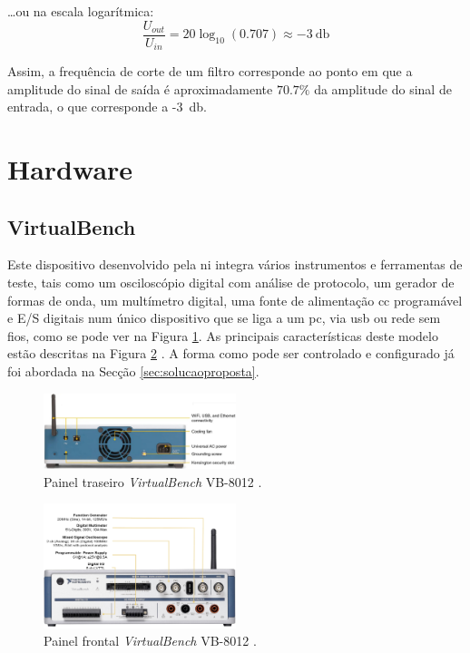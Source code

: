 	\ldots ou na escala logarítmica:  
\begin{equation} \label{eq:relacaoGanhodB}
	\frac{U_{out}}{U_{in}} = 20 \log_{10} (0.707) \approx -\SI{3}{\decibel}	
\end{equation}
	
Assim, a frequência de corte de um filtro corresponde ao ponto em que a amplitude do sinal de saída é aproximadamente $70.7\%$ da amplitude do sinal de entrada, o que corresponde a -\SI{3}{\decibel}. 

\section{Hardware}
\label{sec:hardware}
\subsection{VirtualBench}
Este dispositivo desenvolvido pela \acrshort{ni} integra vários instrumentos e ferramentas de teste, tais como um osciloscópio digital com análise de protocolo, um gerador de formas de onda, um multímetro digital, uma fonte de alimentação \acrfull{cc} programável e E/S digitais num único dispositivo que se liga a um \acrshort{pc}, via \acrshort{usb} ou rede sem fios, como se pode ver na Figura \ref{fig:paineltraseiro}. As principais características deste modelo estão descritas na Figura \ref{fig:paineldianteiro} \cite{datasheetVirtualBench}. A forma como pode ser controlado e configurado já foi abordada na Secção \ref{sec:solucaoproposta}.

\begin{figure}[hbtp]
    \centering
    \centering
    \includegraphics[width=0.5\textwidth]{figures/virtualbench_back-panel.jpg}
    \caption{Painel traseiro \textit{VirtualBench} VB-8012  \cite{datasheetVirtualBench}.}
    \label{fig:paineltraseiro}
\end{figure}

\begin{figure}[hbtp]
    \centering
    \includegraphics[width=0.5\textwidth]{figures/virtualbench_front-panel.jpg}
    \caption{Painel frontal \textit{VirtualBench} VB-8012  \cite{datasheetVirtualBench}.}
    \label{fig:paineldianteiro}
\end{figure}

